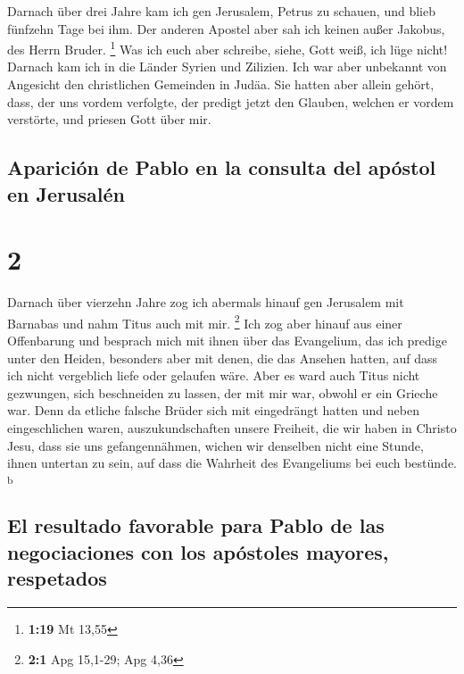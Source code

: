  Darnach über drei Jahre kam ich gen Jerusalem, Petrus zu
schauen, und blieb fünfzehn Tage bei ihm.  Der anderen
Apostel aber sah ich keinen außer Jakobus, des Herrn Bruder. \footnote{\textbf{1:19}
  Mt 13,55}  Was ich euch aber schreibe, siehe, Gott
weiß, ich lüge nicht!  Darnach kam ich in die Länder
Syrien und Zilizien.  Ich war aber unbekannt von
Angesicht den christlichen Gemeinden in Judäa.  Sie
hatten aber allein gehört, dass, der uns vordem verfolgte, der predigt
jetzt den Glauben, welchen er vordem verstörte,  und
priesen Gott über mir.

\hypertarget{apariciuxf3n-de-pablo-en-la-consulta-del-apuxf3stol-en-jerusaluxe9n}{%
\subsection{Aparición de Pablo en la consulta del apóstol en
Jerusalén}\label{apariciuxf3n-de-pablo-en-la-consulta-del-apuxf3stol-en-jerusaluxe9n}}

\hypertarget{section-1}{%
\section{2}\label{section-1}}

 Darnach über vierzehn Jahre zog ich abermals hinauf gen
Jerusalem mit Barnabas und nahm Titus auch mit mir. \footnote{\textbf{2:1}
  Apg 15,1-29; Apg 4,36}  Ich zog aber hinauf aus einer
Offenbarung und besprach mich mit ihnen über das Evangelium, das ich
predige unter den Heiden, besonders aber mit denen, die das Ansehen
hatten, auf dass ich nicht vergeblich liefe oder gelaufen wäre.
 Aber es ward auch Titus nicht gezwungen, sich beschneiden
zu lassen, der mit mir war, obwohl er ein Grieche war. 
Denn da etliche falsche Brüder sich mit eingedrängt hatten und neben
eingeschlichen waren, auszukundschaften unsere Freiheit, die wir haben
in Christo Jesu, dass sie uns gefangennähmen,  wichen wir
denselben nicht eine Stunde, ihnen untertan zu sein, auf dass die
Wahrheit des Evangeliums bei euch bestünde. \textsuperscript{b}

\hypertarget{el-resultado-favorable-para-pablo-de-las-negociaciones-con-los-apuxf3stoles-mayores-respetados}{%
\subsection{El resultado favorable para Pablo de las negociaciones con
los apóstoles mayores,
respetados}\label{el-resultado-favorable-para-pablo-de-las-negociaciones-con-los-apuxf3stoles-mayores-respetados}}


